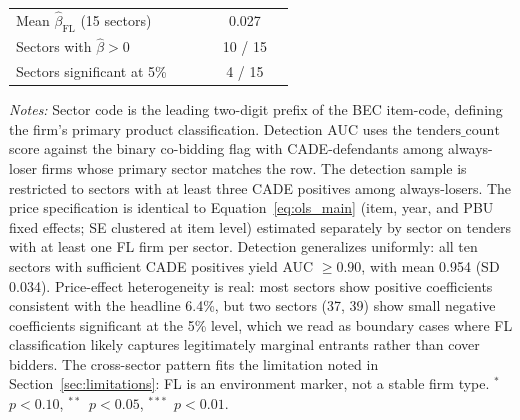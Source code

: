 \begin{table}[htbp]
\begin{threeparttable}
\begin{tabular}{lccccc}
\quad Mean $\hat{\beta}_{\mathrm{FL}}$ (15 sectors) & & & & 0.027 & \\
\quad Sectors with $\hat{\beta} > 0$ & & & & 10 / 15 & \\
\quad Sectors significant at 5\% & & & & 4 / 15 & \\
\bottomrule
\end{tabular}
\begin{tablenotes}
\small
\item \textit{Notes:} Sector code is the leading two-digit prefix of
the BEC item-code, defining the firm's primary product
classification. Detection AUC uses the
$\text{tenders\_count}$ score against the binary co-bidding flag
with CADE-defendants among always-loser firms whose
primary sector matches the row. The detection sample is restricted
to sectors with at least three CADE positives among always-losers.
The price specification is identical to Equation~\eqref{eq:ols_main}
(item, year, and PBU fixed effects; SE clustered at item level)
estimated separately by sector on tenders with at least one FL
firm per sector. Detection generalizes uniformly: all ten sectors
with sufficient CADE positives yield AUC $\geq 0.90$, with mean
0.954 (SD 0.034). Price-effect heterogeneity is real: most sectors
show positive coefficients consistent with the headline 6.4\%, but
two sectors (37, 39) show small negative coefficients significant
at the 5\% level, which we read as boundary cases where FL
classification likely captures legitimately marginal entrants
rather than cover bidders. The cross-sector pattern fits the
limitation noted in Section~\ref{sec:limitations}: FL is an
environment marker, not a stable firm type.
$^{*}$~$p<0.10$, $^{**}$~$p<0.05$, $^{***}$~$p<0.01$.
\end{tablenotes}
\end{threeparttable}
\end{table}
